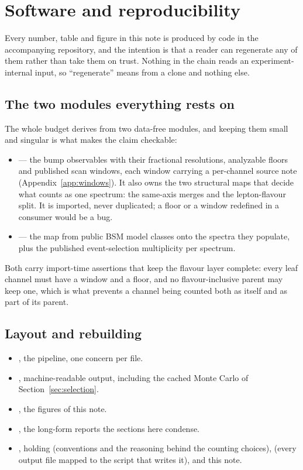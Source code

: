 \section{Software and reproducibility}
\label{sec:software}

Every number, table and figure in this note is produced by code in the accompanying repository, and
the intention is that a reader can regenerate any of them rather than take them on trust. Nothing
in the chain reads an experiment-internal input, so ``regenerate'' means from a clone and nothing
else.

\subsection{The two modules everything rests on}

The whole budget derives from two data-free modules, and keeping them small and singular is what
makes the claim checkable:

\begin{itemize}[leftmargin=1.4em,itemsep=2pt]
  \item {} --- the bump observables with their fractional
resolutions, analyzable floors and published scan windows, each window carrying a per-channel
source note (Appendix~\ref{app:windows}). It also owns the two structural maps that decide what
counts as one spectrum: the same-axis merges and the lepton-flavour split. It is imported, never
duplicated; a floor or a window redefined in a consumer would be a bug.
  \item {} --- the map from public BSM model classes onto the spectra
they populate, plus the published event-selection multiplicity per spectrum.
\end{itemize}

Both carry import-time assertions that keep the flavour layer complete: every leaf channel must have
a window and a floor, and no flavour-inclusive parent may keep one, which is what prevents a channel
being counted both as itself and as part of its parent.

\subsection{Layout and rebuilding}

\begin{itemize}[leftmargin=1.4em,itemsep=2pt]
  \item {}, the pipeline, one concern per file.
  \item {}, machine-readable output, including the cached Monte Carlo of
Section~\ref{sec:selection}.
  \item {}, the figures of this note.
  \item {}, the long-form reports the sections here condense.
  \item {}, holding  (conventions and the reasoning behind the
counting choices),  (every output file mapped to the script that writes it), and
this note.
\end{itemize}

